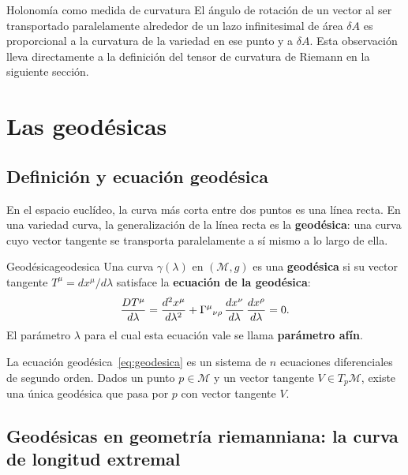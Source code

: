 \begin{observacion}{Holonomía como medida de curvatura}{}
El ángulo de rotación de un vector al ser transportado paralelamente alrededor de un lazo infinitesimal de área $\delta A$ es proporcional a la curvatura de la variedad en ese punto y a $\delta A$. Esta observación lleva directamente a la definición del tensor de curvatura de Riemann en la siguiente sección.
\end{observacion}

\section{Las geodésicas}
\label{sec:geodesicas}

\subsection{Definición y ecuación geodésica}

En el espacio euclídeo, la curva más corta entre dos puntos es una línea recta. En una variedad curva, la generalización de la línea recta es la \textbf{geodésica}: una curva cuyo vector tangente se transporta paralelamente a sí mismo a lo largo de ella.

\begin{definicion}{Geodésica}{geodesica}
Una curva $\gamma(\lambda)$ en $(\mathcal{M}, g)$ es una \textbf{geodésica} si su vector tangente $T^\mu = dx^\mu/d\lambda$ satisface la \textbf{ecuación de la geodésica}:
\begin{equation}
  \frac{DT^\mu}{d\lambda}
  = \frac{d^2 x^\mu}{d\lambda^2}
    + \Gamma^{\mu}{}_{\nu \rho}\, \frac{dx^\nu}{d\lambda}\, \frac{dx^\rho}{d\lambda} = 0.
  \label{eq:geodesica}
\end{equation}
El parámetro $\lambda$ para el cual esta ecuación vale se llama \textbf{parámetro afín}.
\end{definicion}

La ecuación geodésica~\eqref{eq:geodesica} es un sistema de $n$ ecuaciones diferenciales de segundo orden. Dados un punto $p \in \mathcal{M}$ y un vector tangente $V \in T_p\mathcal{M}$, existe una única geodésica que pasa por $p$ con vector tangente $V$.

\subsection{Geodésicas en geometría riemanniana: la curva de longitud extremal}

